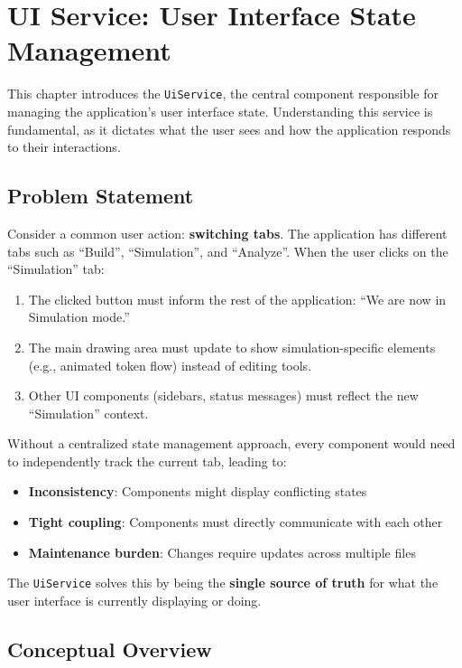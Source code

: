\chapter{UI Service: User Interface State Management}
\label{chap:ui-service}

This chapter introduces the \texttt{UiService}, the central component responsible for managing the application's user interface state. Understanding this service is fundamental, as it dictates what the user sees and how the application responds to their interactions.

\section{Problem Statement}
\label{sec:ui-problem}

Consider a common user action: \textbf{switching tabs}. The application has different tabs such as ``Build'', ``Simulation'', and ``Analyze''. When the user clicks on the ``Simulation'' tab:

\begin{enumerate}
    \item The clicked button must inform the rest of the application: ``We are now in Simulation mode.''
    \item The main drawing area must update to show simulation-specific elements (e.g., animated token flow) instead of editing tools.
    \item Other UI components (sidebars, status messages) must reflect the new ``Simulation'' context.
\end{enumerate}

Without a centralized state management approach, every component would need to independently track the current tab, leading to:
\begin{itemize}
    \item \textbf{Inconsistency}: Components might display conflicting states
    \item \textbf{Tight coupling}: Components must directly communicate with each other
    \item \textbf{Maintenance burden}: Changes require updates across multiple files
\end{itemize}

The \texttt{UiService} solves this by being the \textbf{single source of truth} for what the user interface is currently displaying or doing.

\section{Conceptual Overview}
\label{sec:ui-concept}


